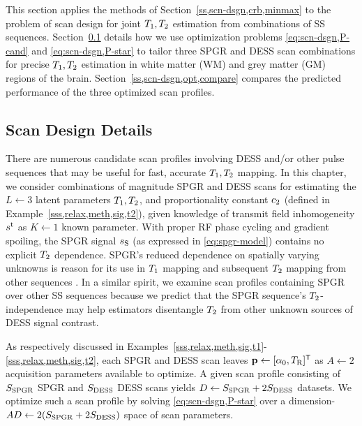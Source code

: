 This section applies the methods 
of Section~\ref{ss,scn-dsgn,crb,minmax} 
to the problem of scan design 
for joint $T_1,T_2$ estimation 
from combinations of SS sequences. 
Section~\ref{ss,scn-dsgn,opt,design} details 
how we use optimization problems
\eqref{eq:scn-dsgn,P-cand} and \eqref{eq:scn-dsgn,P-star} 
to tailor three SPGR and DESS scan combinations
for precise $T_1,T_2$ estimation 
in white matter (WM) and grey matter (GM) regions 
of the brain. 
Section~\ref{ss,scn-dsgn,opt,compare} compares the predicted performance 
of the three optimized scan profiles.

\subsection{Scan Design Details}
\label{ss,scn-dsgn,opt,design}

There are numerous candidate scan profiles
involving DESS and/or other pulse sequences
that may be useful
for fast, accurate $T_1,T_2$ mapping.
In this chapter,
we consider combinations
of magnitude SPGR and DESS scans
for estimating the $L\gets3$ latent parameters
$T_1,T_2$, and proportionality constant $c_{2}$
(defined in Example~\ref{sss,relax,meth,sig,t2}),
given knowledge 
of transmit field inhomogeneity $s^{\mathrm{t}}$
as $K \gets 1$ known parameter.
With proper RF phase cycling
and gradient spoiling,
the SPGR signal $s_{\mathrm{S}}$
(as expressed in \eqref{eq:spgr-model})
contains no explicit $T_2$ dependence.
SPGR's reduced dependence
on spatially varying unknowns
is reason for its use in $T_1$ mapping
\cite{fram:87:rco, chang:08:lls, wang:12:srt}
and subsequent $T_2$ mapping
from other sequences
\cite{deoni:03:rct, nataraj:14:mbe}.
In a similar spirit, 
we examine scan profiles containing SPGR 
over other SS sequences because we predict 
that the SPGR sequence's $T_2$-independence 
may help estimators disentangle $T_2$ 
from other unknown sources of DESS signal contrast.

As respectively discussed
in Examples~\ref{sss,relax,meth,sig,t1}-\ref{sss,relax,meth,sig,t2},
each SPGR and DESS scan leaves 
$\mathbf{p} \gets [\alpha_0, T_\mathrm{R}]^{\mathsf{T}}$
as $A \gets 2$ acquisition parameters
available to optimize.
A given scan profile consisting 
of $S_{\mathrm{SPGR}}$ SPGR and $S_{\mathrm{DESS}}$ DESS scans 
yields $D \gets S_{\mathrm{SPGR}} + 2S_{\mathrm{DESS}}$ datasets. 
We optimize such a scan profile 
by solving \eqref{eq:scn-dsgn,P-star} 
over a dimension-$AD \gets 2(S_{\mathrm{SPGR}} + 2S_{\mathrm{DESS}})$ space 
of scan parameters.

